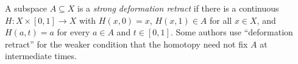 
A subspace $A\subseteq X$ is a \emph{strong deformation retract} if there is a continuous $H:X\times[0,1]\to X$ with $H(x,0)=x$, $H(x,1)\in A$ for all $x\in X$, and $H(a,t)=a$ for every $a\in A$ and $t\in[0,1]$. Some authors use ``deformation retract'' for the weaker condition that the homotopy need not fix $A$ at intermediate times.
